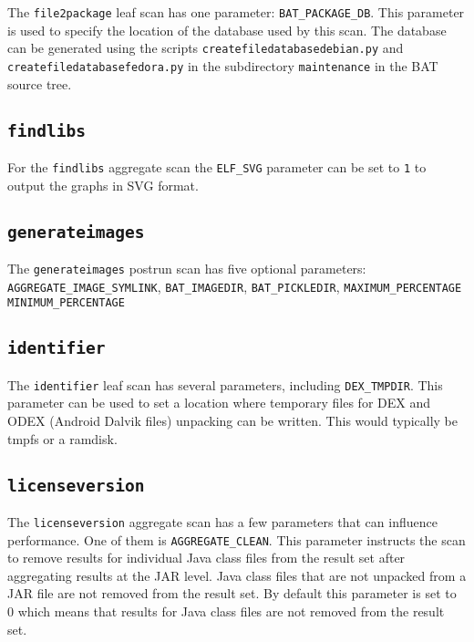 \documentclass[10pt]{article}
\begin{document}
The \texttt{file2package} leaf scan has one parameter:
\texttt{BAT\_PACKAGE\_DB}.  This parameter is used to specify the location of
the database used by this scan. The database can be generated using the scripts
\texttt{createfiledatabasedebian.py} and \texttt{createfiledatabasefedora.py}
in the subdirectory \texttt{maintenance} in the BAT source tree.

\subsection{\texttt{findlibs}}

For the \texttt{findlibs} aggregate scan the \texttt{ELF\_SVG} parameter can be
set to \texttt{1} to output the graphs in SVG format.

\subsection{\texttt{generateimages}}

The \texttt{generateimages} postrun scan has five optional parameters:
\texttt{AGGREGATE\_IMAGE\_SYMLINK}, \texttt{BAT\_IMAGEDIR}, \texttt{BAT\_PICKLEDIR}, \texttt{MAXIMUM\_PERCENTAGE}
\texttt{MINIMUM\_PERCENTAGE}

\subsection{\texttt{identifier}}

The \texttt{identifier} leaf scan has several parameters, including
\texttt{DEX\_TMPDIR}. This parameter can be used to set a location where
temporary files for DEX and ODEX (Android Dalvik files) unpacking can be
written. This would typically be tmpfs or a ramdisk.

\subsection{\texttt{licenseversion}}

The \texttt{licenseversion} aggregate scan has a few parameters that can
influence performance. One of them is \texttt{AGGREGATE\_CLEAN}. This parameter
instructs the scan to remove results for individual Java class files from the
result set after aggregating results at the JAR level. Java class files that
are not unpacked from a JAR file are not removed from the result set. By
default this parameter is set to 0 which means that results for Java class
files are not removed from the result set.
\end{document}

